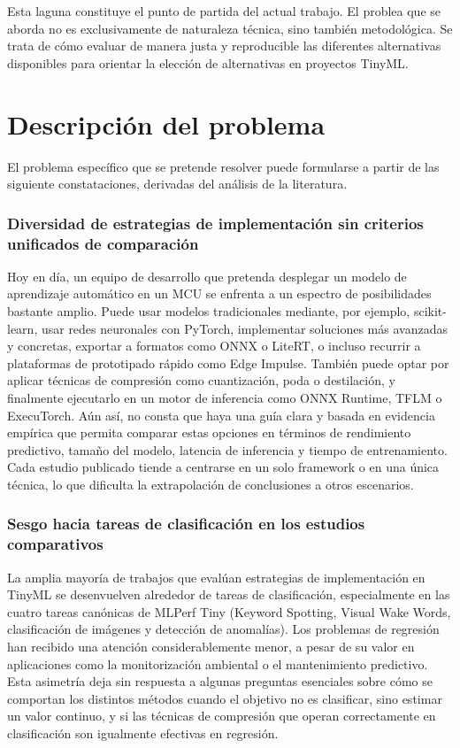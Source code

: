 \documentclass[a4paper,12pt,twoside,final]{book}
\begin{document}
Esta laguna constituye el punto de partida del actual trabajo. El problea que se aborda no es exclusivamente de
naturaleza técnica, sino también metodológica. Se trata de cómo evaluar de manera justa y reproducible las
diferentes alternativas disponibles para orientar la elección de alternativas en proyectos TinyML.

\section{Descripción del problema}
El problema específico que se pretende resolver puede formularse a partir de las siguiente constataciones, derivadas
del análisis de la literatura.

\subsubsection*{Diversidad de estrategias de implementación sin criterios unificados de comparación}
Hoy en día, un equipo de desarrollo que pretenda desplegar un modelo de aprendizaje automático en un MCU se enfrenta
a un espectro de posibilidades bastante amplio. Puede usar modelos tradicionales mediante, por ejemplo, scikit-learn,
usar redes neuronales con PyTorch, implementar soluciones más avanzadas y concretas, exportar a formatos como ONNX o
LiteRT, o incluso recurrir a plataformas de prototipado rápido como Edge Impulse. También puede optar por aplicar
técnicas de compresión como cuantización, poda o destilación, y finalmente ejecutarlo en un motor de inferencia como
ONNX Runtime, TFLM o ExecuTorch. Aún así, no consta que haya una guía clara y basada en evidencia empírica que
permita comparar estas opciones en términos de rendimiento predictivo, tamaño del modelo, latencia de inferencia y
tiempo de entrenamiento. Cada estudio publicado tiende a centrarse en un solo framework o en una única técnica, lo
que dificulta la extrapolación de conclusiones a otros escenarios.

\subsubsection*{Sesgo hacia tareas de clasificación en los estudios comparativos}
La amplia mayoría de trabajos que evalúan estrategias de implementación en TinyML se desenvuelven alrededor de tareas
de clasificación, especialmente en las cuatro tareas canónicas de MLPerf Tiny (Keyword Spotting, Visual Wake Words,
clasificación de imágenes y detección de anomalías). Los problemas de regresión han recibido una atención
considerablemente menor, a pesar de su valor en aplicaciones como la monitorización ambiental o el mantenimiento
predictivo. Esta asimetría deja sin respuesta a algunas preguntas esenciales sobre cómo se comportan los distintos
métodos cuando el objetivo no es clasificar, sino estimar un valor continuo, y si las técnicas de compresión que
operan correctamente en clasificación son igualmente efectivas en regresión.
\end{document}
